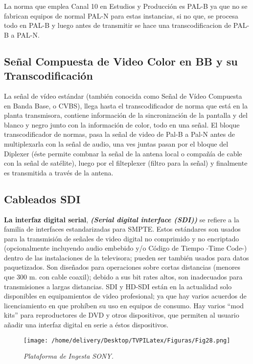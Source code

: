 \documentclass[a4paper,11pt]{article} %
\begin{document}
La norma que emplea Canal 10 en Estudios y Producción es PAL-B ya que no
se fabrican equipos de normal PAL-N para estas instancias, si no que, se
procesa todo en PAL-B y luego antes de transmitir se hace una
transcodificacion de PAL-B a PAL-N.

\subsection{Se\~nal Compuesta de Video Color en BB y su
Transcodificaci\'on}

La señal de vídeo estándar (también conocida como Señal de Vídeo
Compuesta en Banda Base, o CVBS), llega hasta el transcodificador de
norma que está en la planta transmisora, contiene información de la
sincronización de la pantalla y del blanco y negro junto con la
información de color, todo en una señal.
El bloque transcodificador de normas, pasa la señal de video de Pal-B a
Pal-N antes de multiplexarla con la señal de audio, una ves juntas pasan
por el bloque del Diplexer (éste permite combnar la señal de la antena
local o compañía de cable con la señal de satélite), luego por el
filteplexer (filtro para la señal) y finalmente es transmitida a través
de la antena.

\newpage
\subsection{Cableados SDI}

\textbf{La interfaz digital serial}, \textbf{\emph{(Serial digital
interface (SDI))}} se refiere a la familia de interfaces estandarizadas
para SMPTE. Estos estándares son usados para la transmisión de señales
de video digital no comprimido y no encriptado (opcionalmente incluyendo
audio embebido y/o Código de Tiempo -Time Code-) dentro de las
instalaciones de la televisora; pueden ser también usados para datos
paquetizados. Son diseñados para operaciones sobre cortas distancias
(menores que 300 m. con cable coaxil); debido a sus bit rates altos, son
inadecuados para transmisiones a largas distancias. SDI y HD-SDI están
en la actualidad solo  disponibles en equipamientos de video
profesional; ya que hay varios acuerdos de licenciamiento en que
prohíben su uso en equipos de consumo. Hay varios “mod kits” para
reproductores de DVD y otros dispositivos, que permiten al usuario
añadir una interfaz digital en serie a éstos dispositivos.

\begin{figure}[h!] 
\centering
\texttt{[image: /home/delivery/Desktop/TVPILatex/Figuras/Fig28.png]}
\caption{\emph{Plataforma de Ingesta SONY.}}
\end{figure}
\end{document}
